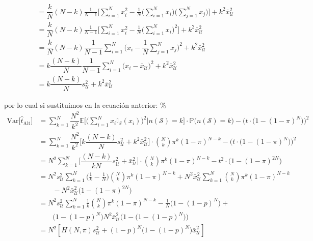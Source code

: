 \documentclass[
]{book}
\begin{document}
\begin{align*}
\\ & =  \dfrac{k}{N}(N-k)  \frac{1}{N-1} \Bigg[  \sum\limits_{i = 1}^N x_i^2 -  \frac{1}{N}\bigg( \sum\limits_{i = 1}^N x_i \bigg) \bigg( \sum\limits_{j = 1}^N  x_j\bigg) \Bigg] + k^2 \bar{x}_{\mathcal{U}}^2
\\ & =  \dfrac{k}{N}(N-k)  \frac{1}{N-1} \Bigg[  \sum\limits_{i = 1}^N x_i^2 -  \frac{1}{N}\bigg( \sum\limits_{i = 1}^N x_i \bigg)^2  \Bigg] + k^2 \bar{x}_{\mathcal{U}}^2
\\ & =    \dfrac{k}{N} (N-k) \dfrac{1}{N-1}\sum\limits_{i = 1}^N \Big( x_i - \dfrac{1}{N}\sum_{j = 1}^N x_j\Big)^2  + k^2 \bar{x}_{\mathcal{U}}^2
\\ & =  k  \dfrac{(N- k)}{N} \dfrac{1}{N-1}\sum\limits_{i = 1}^N \Big( x_i - \bar{x}_{\mathcal{U}}\Big)^2  + k^2 \bar{x}_{\mathcal{U}}^2
\\ & = k \dfrac{(N- k)}{N}  s^2_{\mathcal{U}} + k^2 \bar{x}_{\mathcal{U}}^2
\end{align*}

por lo cual si sustituimos en la ecuación anterior:
\%\begin{equation}\nonumber
\begin{aligned}
 \text{Var}\big[ \hat{t}_{\text{Alt}} \big] &  = \sum\limits_{k = 1}^N \dfrac{N^2}{k^2} \mathbb{E}\bigg[ \Big( \sum\limits_{i = 1}^N x_i \mathbb{I}_{\mathcal{S}}(x_i)\Big)^2 \bigg| n(\mathcal{S}) = k\bigg]\cdot \mathbb{P}\big(n(\mathcal{S}) = k\big) - \Big( t \cdot \big( 1 - (1 - \pi)^N\big)\Big)^2
 \\ & = \sum\limits_{k = 1}^N \dfrac{N^2}{k^2}  \Big[ k \dfrac{(N- k)}{N}  s^2_{\mathcal{U}} + k^2 \bar{x}_{\mathcal{U}}^2 \Big] \cdot \binom{N}{k} \pi^k (1 - \pi)^{N-k} - \Big( t \cdot \big( 1 - (1 - \pi)^N\big)\Big)^2
 \\ & = N^2 \sum\limits_{k = 1}^N   \Big[ \dfrac{(N- k)}{k N}  s^2_{\mathcal{U}} + \bar{x}_{\mathcal{U}}^2 \Big] \cdot \binom{N}{k} \pi^k (1 - \pi)^{N-k} - t^2 \cdot \big( 1 - (1 - \pi)^{2N}\big)
 \\ & = N^2 s^2_{\mathcal{U}} \sum\limits_{k = 1}^N   \Big( \frac{1}{k} - \frac{1}{N} \Big)  \binom{N}{k} \pi^k (1 - \pi)^{N-k} + N^2  \bar{x}_{\mathcal{U}}^2 \sum\limits_{k = 1}^N  \binom{N}{k} \pi^k (1 - \pi)^{N-k}
 \\ & \qquad -  N^2 \bar{x}_{\mathcal{U}}^2\big( 1 - (1 - \pi)^{2N}\big)
 \\ & =  N^2 s^2_{\mathcal{U}} \sum\limits_{k = 1}^N  \frac{1}{k}  \binom{N}{k} \pi^k (1 - \pi)^{N-k}  - \frac{1}{N} \big( 1 - (1 - p)^N \big) + 
 \\ & \qquad \big( 1 - (1 - p)^N \big) N^2\bar{x}_{\mathcal{U}}^2\Big( 1 - \big( 1 - (1 - p)^N \big) \Big) 
 \\ & = N^2[ H(N,\pi) s^2_{\mathcal{U}} + (1 - p)^N\big( 1 - (1 - p)^N \big) \bar{x}_{\mathcal{U}}^2 ]
\end{aligned}
\end{equation}
\end{document}

